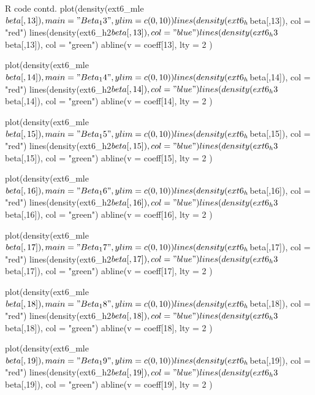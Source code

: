 \documentclass{article}
\begin{document}
\begin{sexylisting}{R code contd.}
plot(density(ext6_mle$beta[,13]), main = "Beta_13", ylim = c(0,10))
lines(density(ext6_h$beta[,13]), col = "red")
lines(density(ext6_h2$beta[,13]), col = "blue")
lines(density(ext6_h3$beta[,13]), col = "green")
abline(v = coeff[13], lty = 2 )

plot(density(ext6_mle$beta[,14]), main = "Beta_14", ylim = c(0,10))
lines(density(ext6_h$beta[,14]), col = "red")
lines(density(ext6_h2$beta[,14]), col = "blue")
lines(density(ext6_h3$beta[,14]), col = "green")
abline(v = coeff[14], lty = 2 )

plot(density(ext6_mle$beta[,15]), main = "Beta_15", ylim = c(0,10))
lines(density(ext6_h$beta[,15]), col = "red")
lines(density(ext6_h2$beta[,15]), col = "blue")
lines(density(ext6_h3$beta[,15]), col = "green")
abline(v = coeff[15], lty = 2 )

plot(density(ext6_mle$beta[,16]), main = "Beta_16", ylim = c(0,10))
lines(density(ext6_h$beta[,16]), col = "red")
lines(density(ext6_h2$beta[,16]), col = "blue")
lines(density(ext6_h3$beta[,16]), col = "green")
abline(v = coeff[16], lty = 2 )

plot(density(ext6_mle$beta[,17]), main = "Beta_17", ylim = c(0,10))
lines(density(ext6_h$beta[,17]), col = "red")
lines(density(ext6_h2$beta[,17]), col = "blue")
lines(density(ext6_h3$beta[,17]), col = "green")
abline(v = coeff[17], lty = 2 )

plot(density(ext6_mle$beta[,18]), main = "Beta_18", ylim = c(0,10))
lines(density(ext6_h$beta[,18]), col = "red")
lines(density(ext6_h2$beta[,18]), col = "blue")
lines(density(ext6_h3$beta[,18]), col = "green")
abline(v = coeff[18], lty = 2 )

plot(density(ext6_mle$beta[,19]), main = "Beta_19", ylim = c(0,10))
lines(density(ext6_h$beta[,19]), col = "red")
lines(density(ext6_h2$beta[,19]), col = "blue")
lines(density(ext6_h3$beta[,19]), col = "green")
abline(v = coeff[19], lty = 2 )
\end{sexylisting}
\end{document}
